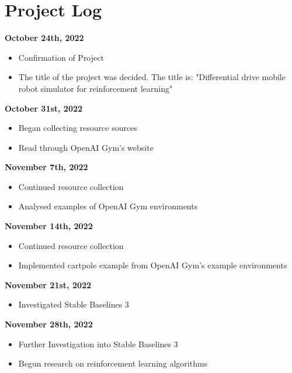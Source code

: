 \documentclass[a4paper,12pt]{article}
\begin{document}
\section{Project Log}
\vspace{.7cm}
\textbf{\large October 24th, 2022}
\begin{itemize}
  \item Confirmation of Project
  \item The title of the project was decided. The title is: "Differential drive mobile robot simulator for reinforcement learning"

\end{itemize}
\vspace{.7cm}
\textbf{\large October 31st, 2022}
\begin{itemize}
  \item Began collecting resource sources
  \item Read through OpenAI Gym's website

\end{itemize}
\vspace{.7cm}
\textbf{\large November 7th, 2022}
\begin{itemize}
  \item Continued resource collection
  \item Analysed examples of OpenAI Gym environments

\end{itemize}
\vspace{.7cm}
\textbf{\large November 14th, 2022}
\begin{itemize}
  \item Continued resource collection
  \item Implemented cartpole example from OpenAI Gym's example environments

\end{itemize}
\vspace{.7cm}
\textbf{\large November 21st, 2022}
\begin{itemize}
  \item Investigated Stable Baselines 3

\end{itemize}
\vspace{.7cm}
\textbf{\large November 28th, 2022}
\begin{itemize}
  \item Further Investigation into Stable Baselines 3
  \item Begun research on reinforcement learning algorithms

\end{itemize}
\end{document}
